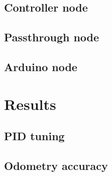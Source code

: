 \documentclass[11pt]{article}
\begin{document}
\subsection{Controller node}
\label{subsec:cn}


\subsection{Passthrough node}
\label{subsec:ptn}

\subsection{Arduino node}
\label{subsec:dd}

\section{Results}

\subsection{PID tuning}
\label{subsec:pidt}

\subsection{Odometry accuracy}


\end{document}
